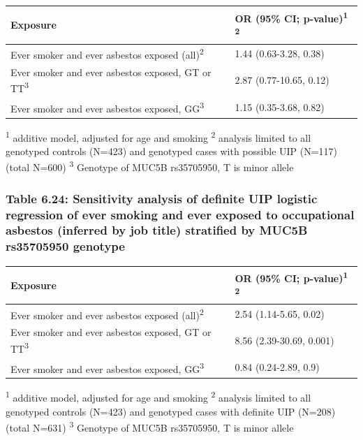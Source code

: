 \begin{longtable}[]{@{}ll@{}}
\toprule
Exposure & OR (95\% CI; p-value)\textsuperscript{1}
\textsuperscript{2}\tabularnewline
\midrule
\endhead
Ever smoker and ever asbestos exposed (all)\textsuperscript{2} & 1.44
(0.63-3.28, 0.38)\tabularnewline
Ever smoker and ever asbestos exposed, GT or TT\textsuperscript{3} &
2.87 (0.77-10.65, 0.12)\tabularnewline
Ever smoker and ever asbestos exposed, GG\textsuperscript{3} & 1.15
(0.35-3.68, 0.82)\tabularnewline
\bottomrule
\end{longtable}

\textsuperscript{1} additive model, adjusted for age and smoking
\textsuperscript{2} analysis limited to all genotyped controls (N=423)
and genotyped cases with possible UIP (N=117) (total N=600)
\textsuperscript{3} Genotype of MUC5B rs35705950, T is minor allele

\hypertarget{table-6.24-sensitivity-analysis-of-definite-uip-logistic-regression-of-ever-smoking-and-ever-exposed-to-occupational-asbestos-inferred-by-job-title-stratified-by-muc5b-rs35705950-genotype}{%
\subsubsection{Table 6.24: Sensitivity analysis of definite UIP logistic
regression of ever smoking and ever exposed to occupational asbestos
(inferred by job title) stratified by MUC5B rs35705950
genotype}\label{table-6.24-sensitivity-analysis-of-definite-uip-logistic-regression-of-ever-smoking-and-ever-exposed-to-occupational-asbestos-inferred-by-job-title-stratified-by-muc5b-rs35705950-genotype}}

\begin{longtable}[]{@{}ll@{}}
\toprule
Exposure & OR (95\% CI; p-value)\textsuperscript{1}
\textsuperscript{2}\tabularnewline
\midrule
\endhead
Ever smoker and ever asbestos exposed (all)\textsuperscript{2} & 2.54
(1.14-5.65, 0.02)\tabularnewline
Ever smoker and ever asbestos exposed, GT or TT\textsuperscript{3} &
8.56 (2.39-30.69, 0.001)\tabularnewline
Ever smoker and ever asbestos exposed, GG\textsuperscript{3} & 0.84
(0.24-2.89, 0.9)\tabularnewline
\bottomrule
\end{longtable}

\textsuperscript{1} additive model, adjusted for age and smoking
\textsuperscript{2} analysis limited to all genotyped controls (N=423)
and genotyped cases with definite UIP (N=208) (total N=631)
\textsuperscript{3} Genotype of MUC5B rs35705950, T is minor allele

